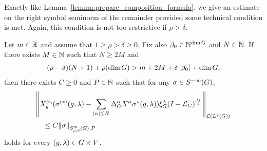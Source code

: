 Exactly like Lemma~\ref{lemma:prepare_composition_formula},
we give an estimate on the right symbol seminorm of the remainder provided some technical condition is met.
Again,
this condition is not too restrictive if $\rho > \delta$.

\begin{lemma}
\label{lemma:prepare_adjoint_formula}
    Let $m \in \mathbb{R}$ and
    assume that $1 \geq \rho > \delta \geq 0$.
    Fix also $\beta_0 \in \mathbb{N}^{\dim G}$ and $N \in \mathbb{N}$.
    If there exists $M \in \mathbb{N}$ such that $N \geq 2M$ and
    \begin{align*}
        (\rho - \delta) (N + 1) + \rho (\dim G)
        > m + 2 M + \delta \left|{\beta_0}\right| + \dim G,
    \end{align*}
    then there exists $C \geq 0$ and $P \in \mathbb{N}$ such that for any $\sigma \in {S^{-\infty} (G)}$,
    \begin{align*}
        &\norm [\Lin {\Lebesgue 2 \Group}] {%
        \LeftDifferentialOperator [g] {\beta_0} (
            \sigma^{(*)}(g,\lambda)
            - \sum_{\abs \alpha \leq N} \DifferenceOperatorOrder \alpha \LeftDifferentialOperator \alpha \adj \sigma(g, \lambda))
            \Rep \lambda \BesselPotential M
        }\\
        &\quad \leq C \SymbolSemiNorm m {\rho, \delta} P \sigma
    \end{align*}
    holds for every $(g, \lambda) \in G \times V$.
\end{lemma}
